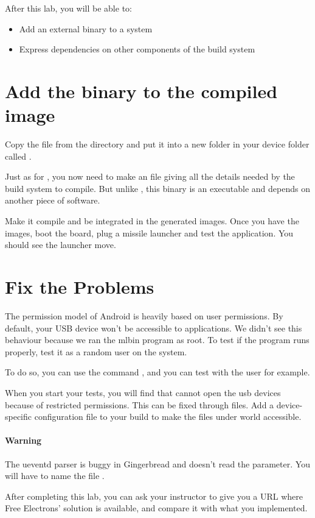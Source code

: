 
After this lab, you will be able to:
\begin{itemize}
  \item Add an external binary to a system
  \item Express dependencies on other components of the build system
\end{itemize}

\section{Add the binary to the compiled image}
Copy the  file from the
 directory and put it into a new
folder in your device folder called .

Just as for , you now need to make an  file
giving all the details needed by the build system to compile. But
unlike , this binary is an executable and depends on another
piece of software.

Make it compile and be integrated in the generated images. Once you
have the images, boot the board, plug a missile launcher and test the
application. You should see the launcher move.

\section{Fix the Problems}

The permission model of Android is heavily based on user
permissions. By default, your USB device won't be accessible to
applications. We didn't see this behaviour because we ran the mlbin
program as root. To test if the program runs properly, test it as a
random user on the system.

To do so, you can use the command , and you can test with the
user  for example.

When you start your tests, you will find that  cannot
open the usb devices because of restricted permissions. This can be
fixed through  files. Add a device-specific
 configuration file to your build to make the files
under  world accessible.

\paragraph{Warning} The ueventd parser is buggy in Gingerbread and
doesn't read the  parameter. You will have
to name the file .

After completing this lab, you can ask your instructor to
give you a URL where Free Electrons' solution is available, and compare
it with what you implemented.
